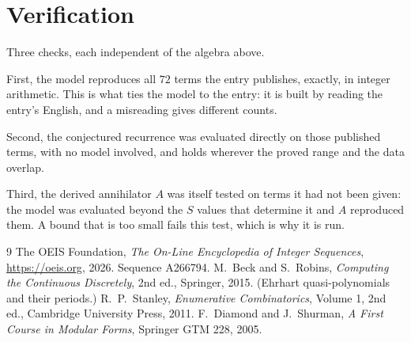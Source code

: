 \documentclass[11pt,a4paper]{article}
\theoremstyle{plain}
\theoremstyle{definition}
\begin{document}
\section{Verification}

Three checks, each independent of the algebra above.

First, the model reproduces all $72$ terms the entry publishes, exactly, in integer
arithmetic. This is what ties the model to the entry: it is built by reading the entry's
English, and a misreading gives different counts.

Second, the conjectured recurrence was evaluated directly on those published terms, with no
model involved, and holds wherever the proved range and the data overlap.

Third, the derived annihilator $A$ was itself tested on terms it had not been given: the model
was evaluated beyond the $S$ values that determine it and $A$ reproduced them. A bound that is
too small fails this test, which is why it is run.

\begin{thebibliography}{9}
 The OEIS Foundation, \emph{The On-Line Encyclopedia of Integer
Sequences}, \url{https://oeis.org}, 2026. Sequence A266794.
 M.~Beck and S.~Robins, \emph{Computing the Continuous Discretely},
2nd ed., Springer, 2015. (Ehrhart quasi-polynomials and their periods.)
 R.~P.~Stanley, \emph{Enumerative Combinatorics}, Volume 1, 2nd ed.,
Cambridge University Press, 2011.
 F.~Diamond and J.~Shurman, \emph{A First Course in Modular Forms},
Springer GTM 228, 2005.
\end{thebibliography}
\end{document}
